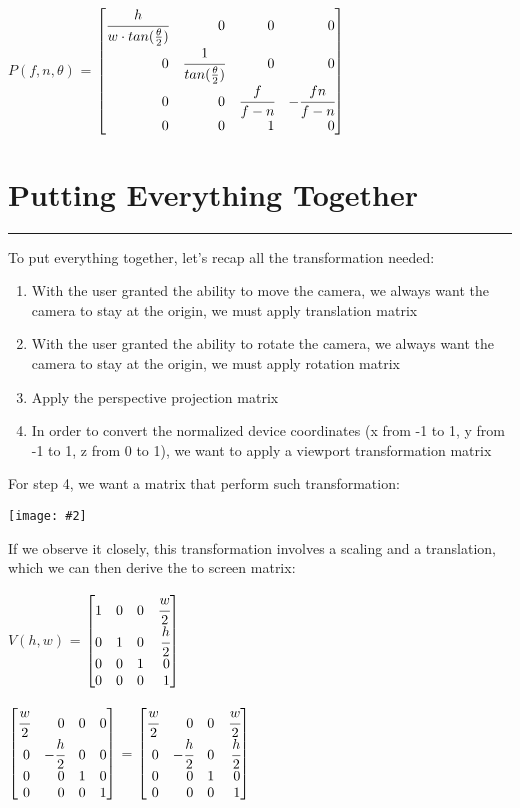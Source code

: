 \documentclass[11pt]{article}
\newcommand{\image}[2]{\texttt{[image: \#2]}}
\newcommand{\mysection}[1]{
    \section*{#1}
    \hrule
    \vspace*{0.5cm}
}
\newcommand{\mat}[1]{
    $\begin{bmatrix*}[r]
        #1
    \end{bmatrix*}$
} %
\begin{document}
\begin{center}
    $P(f,n,\theta)$ = \mat{
    \cfrac{h}{w \cdot tan(\frac{\theta}{2})} & 0 & 0 & 0\\
    0 & \cfrac{1}{tan(\frac{\theta}{2})} & 0 & 0\\
    0 & 0 & \cfrac{f}{f-n} & -\cfrac{fn}{f-n} \\
    0 & 0 & 1 & 0
} 
\end{center}
\mysection{Putting Everything Together}
To put everything together, let's recap all the transformation needed: \\
\begin{enumerate}
    \item With the user granted the ability to move the camera, we always want the camera to stay at the origin, we must apply translation matrix 
    \item With the user granted the ability to rotate the camera, we always want the camera to stay at the origin, we must apply rotation matrix 
    \item Apply the perspective projection matrix
    \item In order to convert the normalized device coordinates (x from -1 to 1, y from -1 to 1, z from 0 to 1), we want to apply a viewport transformation matrix
\end{enumerate}
For step 4, we want a matrix that perform such transformation:
\begin{center}
    \image{0.6}{to_screen}
\end{center}
If we observe it closely, this transformation involves a scaling and a translation, which we can then derive the to screen matrix:
\begin{center}
    $V(h,w)$ = \mat{
        1 & 0 & 0 & \cfrac{w}{2} \\
        0 & 1 & 0 & \cfrac{h}{2} \\
        0 & 0 & 1 & 0 \\
        0 & 0 & 0 & 1
    } \mat{
        \cfrac{w}{2} & 0 & 0 & 0 \\
        0 & -\cfrac{h}{2} & 0 & 0 \\
        0 & 0 & 1 & 0 \\
        0 & 0 & 0 & 1
    } = \mat{
        \cfrac{w}{2} & 0 & 0 & \cfrac{w}{2} \\
        0 & -\cfrac{h}{2} & 0 & \cfrac{h}{2} \\
        0 & 0 & 1 & 0 \\
        0 & 0 & 0 & 1
    }
\end{center}
\end{document}
